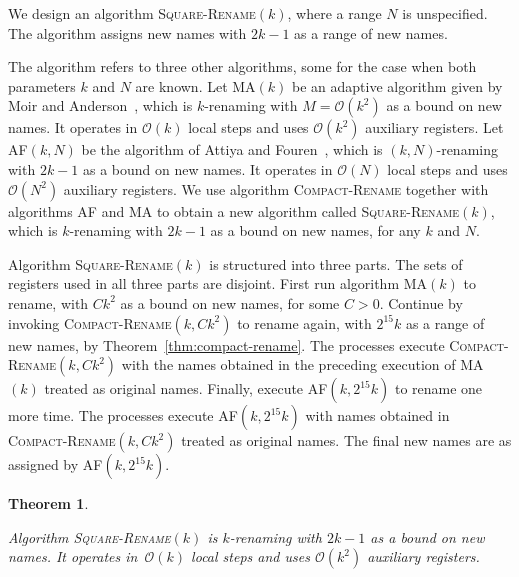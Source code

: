 \documentclass[11pt]{article}
\newcommand{\cO}{\mathcal{O}}
\newtheorem{theorem}{Theorem}
\begin{document}
We design an algorithm \textsc{Square-Rename}$(k)$, where a range $N$ is unspecified.
The algorithm assigns new names with $2k-1$ as a range of new names.

The algorithm refers to three other algorithms, some for the case when both parameters $k$ and $N$ are known.
Let \textsc{MA}$(k)$ be an adaptive algorithm given by Moir and Anderson~\cite{MoirA95}, which is $k$-renaming with $M=\cO(k^2)$ as a  bound on new names.
It operates in $\cO(k)$ local steps and uses $\cO(k^2)$ auxiliary registers.
Let \textsc{AF}$(k,N)$ be the algorithm of Attiya and Fouren~\cite{AttiyaF01}, which is $(k,N)$-renaming with $2k-1$ as a bound on new names.
It operates in $\cO(N)$ local steps and uses $\cO(N^2)$ auxiliary registers.
We use algorithm \textsc{Compact-Rename} together with algorithms \textsc{AF} and \textsc{MA} to obtain a new algorithm called \textsc{Square-Rename}$(k)$, which is $k$-renaming with $2k-1$ as a bound on new names, for any $k$ and $N$.


Algorithm \textsc{Square-Rename}$(k)$ is structured into three parts.
The sets of registers used in all three parts are disjoint.
First run algorithm \textsc{MA}$(k)$ to rename, with $C k^2$ as a  bound on new names, for some $C>0$.
Continue by invoking \textsc{Compact-Rename}$(k,Ck^2)$ to rename again, with $2^{15} k$ as a  range of new names, by Theorem~\ref{thm:compact-rename}.
The processes execute \textsc{Compact-Rename}$(k,Ck^2)$ with the names obtained in the preceding execution of \textsc{MA}$(k)$ treated as original names. 
Finally, execute \textsc{AF}$(k, 2^{15} k)$ to rename one more time.
The processes execute \textsc{AF}$(k,2^{15}k)$ with names obtained in \textsc{Compact-Rename}$(k,Ck^2)$ treated as original names. 
The final new names are as assigned by \textsc{AF}$(k,2^{15} k)$.



\begin{theorem}
\label{thm:square-rename}

Algorithm \textsc{Square-Rename}$(k)$ is $k$-renaming with $2k-1$ as a bound on new names.
It operates  in~$\cO(k)$ local steps and uses $\cO(k^2)$ auxiliary registers.
\end{theorem}
\end{document}
